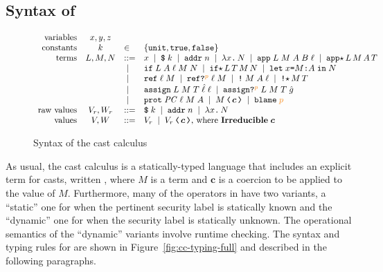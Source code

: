 \subsection{Syntax of \CC}
\label{sec:cc-syntax}

\begin{figure}[tbp]
\raggedright
  {\small \[
  \begin{array}{rcll}
    \text{variables}            & x, y, z   &      & \\
    \text{constants}            & k         & \in  & \{ \unit , \true , \false \} \\
    \text{terms}  & L , M , N & ::=  & x \MID \ccconst{k} \MID \ccaddr{n} \MID \cclam{x}{N} \MID
                                       \ccapp{L}{M}{A}{B}{\ell} \MID \ccappstar{L}{M}{A}{T} \\
                           &  & \MID & \ccif{L}{A}{\ell}{M}{N} \MID \ccifstar{L}{T}{M}{N} \MID
                                       \cclet{x}{M}{A}{N} \\
                           &  & \MID & \ccref{\ell}{M} \MID \ccrefproj{\ell}{M}{p} \MID \ccderef{M}{A}{\ell} \MID \ccderefstar{M}{T} \\
                           &  & \MID & \ccassign{L}{M}{T}{\hat{\ell}}{\ell} \MID \ccassignproj{L}{M}{T}{\hat{g}}{p} \\
                           &   & \MID & \ccprot{\PC}{\ell}{M}{A} \MID \cccast{M}{\bm{c}} \MID \blame{p} \\
    \text{raw values} & V_r, W_r & ::=  &  \ccconst{k} \MID \ccaddr{n} \MID \cclam{x}{N} \\
    \text{values}     & V, W     & ::=  & V_r \MID \cccast{V_r}{\bm{c}} \text{, where } \mathbf{Irreducible}\;\bm{c}
  \end{array}
  \]}
  \caption{Syntax of the cast calculus \CC}
  \label{fig:cc-syntax}
\end{figure}

As usual, the cast calculus \CC is a statically-typed language that includes an
explicit term for casts, written , where $M$ is a term and
$\bm{c}$ is a coercion to be applied to the value of $M$. Furthermore, many of
the operators in \CC have two variants, a ``static'' one for when the pertinent
security label is statically known and the ``dynamic'' one for when the security
label is statically unknown. The operational semantics of the ``dynamic''
variants involve runtime checking. The syntax and typing rules for \CC are shown
in Figure~\ref{fig:cc-typing-full} and described in the following paragraphs.

